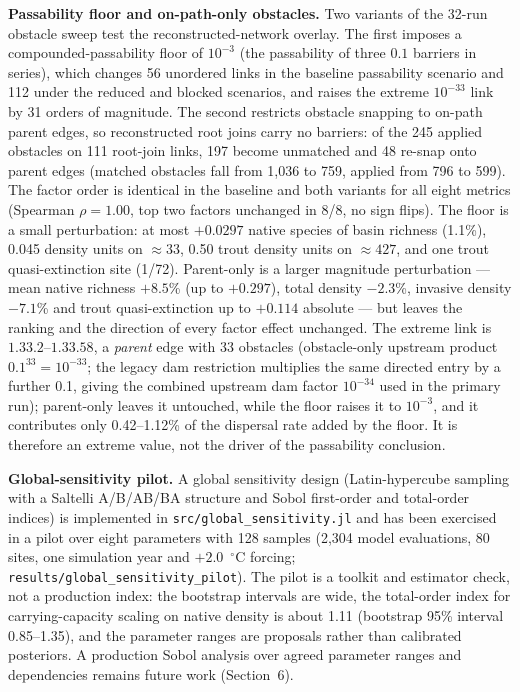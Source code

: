 \documentclass[11pt,a4paper]{article}
\begin{document}
\textbf{Passability floor and on-path-only obstacles.} Two variants of the 32-run obstacle sweep test the reconstructed-network overlay. The first imposes a compounded-passability floor of $10^{-3}$ (the passability of three $0.1$ barriers in series), which changes 56 unordered links in the baseline passability scenario and 112 under the reduced and blocked scenarios, and raises the extreme $10^{-33}$ link by 31 orders of magnitude. The second restricts obstacle snapping to on-path parent edges, so reconstructed root joins carry no barriers: of the 245 applied obstacles on 111 root-join links, 197 become unmatched and 48 re-snap onto parent edges (matched obstacles fall from 1{,}036 to 759, applied from 796 to 599). The factor order is identical in the baseline and both variants for all eight metrics (Spearman $\rho=1.00$, top two factors unchanged in 8/8, no sign flips). The floor is a small perturbation: at most $+0.0297$ native species of basin richness (1.1\%), 0.045 density units on $\approx33$, 0.50 trout density units on $\approx427$, and one trout quasi-extinction site (1/72). Parent-only is a larger magnitude perturbation --- mean native richness $+8.5$\% (up to $+0.297$), total density $-2.3$\%, invasive density $-7.1$\% and trout quasi-extinction up to $+0.114$ absolute --- but leaves the ranking and the direction of every factor effect unchanged. The extreme link is $1.33.2$--$1.33.58$, a \emph{parent} edge with 33 obstacles (obstacle-only upstream product $0.1^{33}=10^{-33}$; the legacy dam restriction multiplies the same directed entry by a further 0.1, giving the combined upstream dam factor $10^{-34}$ used in the primary run); parent-only leaves it untouched, while the floor raises it to $10^{-3}$, and it contributes only 0.42--1.12\% of the dispersal rate added by the floor. It is therefore an extreme value, not the driver of the passability conclusion.

\textbf{Global-sensitivity pilot.} A global sensitivity design (Latin-hypercube sampling with a Saltelli A/B/AB/BA structure and Sobol first-order and total-order indices) is implemented in \texttt{src/global\_sensitivity.jl} and has been exercised in a pilot over eight parameters with 128 samples (2,304 model evaluations, 80 sites, one simulation year and $+2.0$~$^\circ$C forcing; \texttt{results/global\_sensitivity\_pilot}). The pilot is a toolkit and estimator check, not a production index: the bootstrap intervals are wide, the total-order index for carrying-capacity scaling on native density is about 1.11 (bootstrap 95\% interval 0.85--1.35), and the parameter ranges are proposals rather than calibrated posteriors. A production Sobol analysis over agreed parameter ranges and dependencies remains future work (Section~6).
\end{document}
